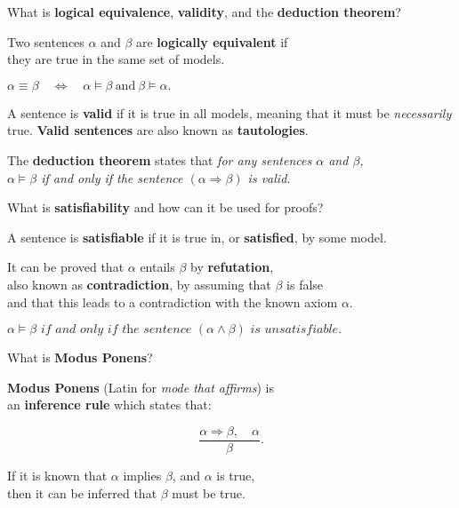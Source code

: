 \begin{flashcard}[Question]{What is \textbf{logical equivalence}, \textbf{validity}, and the \textbf{deduction theorem}?}
\begin{center}
Two sentences $\alpha$ and $\beta$ are \textbf{logically equivalent} if\\they are true in the same set of models.

\medskip

$\alpha \equiv \beta \quad \Leftrightarrow \quad \alpha \models \beta ~ \text{and} ~ \beta \models \alpha .$

\medskip

A sentence is \textbf{valid} if it is true in all models, meaning that it must be \textit{necessarily} true. \textbf{Valid sentences} are also known as \textbf{tautologies}.

\medskip

The \textbf{deduction theorem} states that \textit{for any sentences $\alpha$ and $\beta$,\\$\alpha \models \beta$ if and only if the sentence $(\alpha \Rightarrow \beta)$ is valid.}
\end{center}
\end{flashcard}

\begin{flashcard}[Question]{What is \textbf{satisfiability} and how can it be used for proofs?}
\begin{center}
A sentence is \textbf{satisfiable} if it is true in, or \textbf{satisfied}, by some model.

\medskip

It can be proved that $\alpha$ entails $\beta$ by \textbf{refutation},\\also known as \textbf{contradiction}, by assuming that $\beta$ is false\\and that this leads to a contradiction with the known axiom $\alpha$.

\medskip

$\alpha \models \beta \textit{~if and only if the sentence~} (\alpha \land \beta) \textit{~is unsatisfiable.}$
\end{center}
\end{flashcard}

\begin{flashcard}[Question]{What is \textbf{Modus Ponens}?}
\begin{center}
\textbf{Modus Ponens} (Latin for \textit{mode that affirms}) is\\an \textbf{inference rule} which states that:

\begin{displaymath}
\frac{\alpha \Rightarrow \beta, \quad \alpha}{\beta}.
\end{displaymath}

If it is known that $\alpha$ implies $\beta$, and $\alpha$ is true,\\then it can be inferred that $\beta$ must be true.
\end{center}
\end{flashcard}

